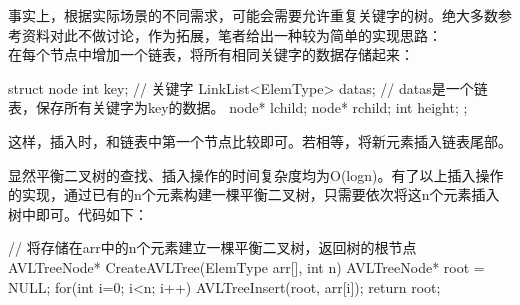 \begin{insightbox}
    事实上，根据实际场景的不同需求，可能会需要允许重复关键字的树。绝大多数参考资料对此不做讨论，作为拓展，笔者给出一种较为简单的实现思路：\\

    在每个节点中增加一个链表，将所有相同关键字的数据存储起来：
    \begin{cppcode}
        struct node {
            int key;    // 关键字   
            LinkList<ElemType> datas;  // datas是一个链表，保存所有关键字为key的数据。
            node* lchild;
            node* rchild;
            int height;
        };
    \end{cppcode}
    这样，插入时，和链表中第一个节点比较即可。若相等，将新元素插入链表尾部。

\end{insightbox}
显然平衡二叉树的查找、插入操作的时间复杂度均为O(logn)。有了以上插入操作的实现，通过已有的n个元素构建一棵平衡二叉树，只需要依次将这n个元素插入树中即可。代码如下：
\begin{cppcode}
// 将存储在arr中的n个元素建立一棵平衡二叉树，返回树的根节点
    AVLTreeNode* CreateAVLTree(ElemType arr[], int n) {
        AVLTreeNode* root = NULL;
        for(int i=0; i<n; i++) {
            AVLTreeInsert(root, arr[i]);
        }
        return root;
    }
\end{cppcode}


